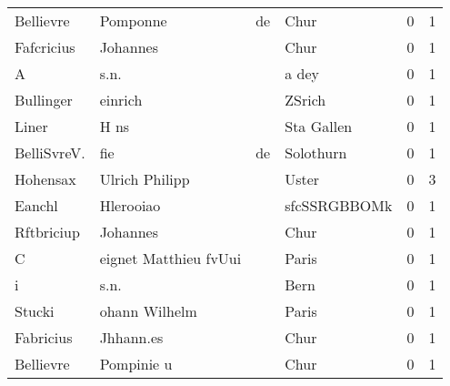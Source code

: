 \begin{center}
\begin{tiny}
\begin{longtabu}{llllrr}
                Bellievre &                           Pomponne &          de &                                        Chur &          0 &         1 \\
               Fafcricius &                           Johannes &             &                                        Chur &          0 &         1 \\
                        A &                               s.n. &             &                                       a dey &          0 &         1 \\
                Bullinger &                            einrich &             &                                      ZSrich &          0 &         1 \\
                    Liner &                               H ns &             &                                  Sta Gallen &          0 &         1 \\
              BelliSvreV. &                                fie &          de &                                   Solothurn &          0 &         1 \\
                 Hohensax &                     Ulrich Philipp &             &                                       Uster &          0 &         3 \\
                   Eanchl &                          Hlerooiao &             &                                sfcSSRGBBOMk &          0 &         1 \\
               Rftbriciup &                           Johannes &             &                                        Chur &          0 &         1 \\
                        C &              eignet Matthieu fvUui &             &                                       Paris &          0 &         1 \\
                        i &                               s.n. &             &                                        Bern &          0 &         1 \\
                   Stucki &                      ohann Wilhelm &             &                                       Paris &          0 &         1 \\
                Fabricius &                          Jhhann.es &             &                                        Chur &          0 &         1 \\
                Bellievre &                         Pompinie u &             &                                        Chur &          0 &         1 \\

\end{longtabu}
\end{tiny}
\end{center}

